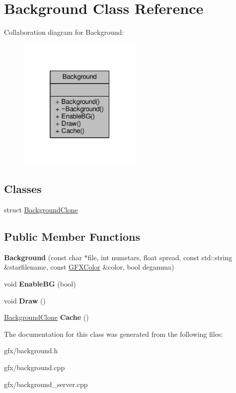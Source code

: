 \hypertarget{classBackground}{}\section{Background Class Reference}
\label{classBackground}


Collaboration diagram for Background\+:
\nopagebreak
\begin{figure}[H]
\begin{center}
\leavevmode
\includegraphics[width=169pt]{d9/d27/classBackground__coll__graph}
\end{center}
\end{figure}
\subsection*{Classes}
\begin{DoxyCompactItemize}
\item 
struct \hyperlink{structBackground_1_1BackgroundClone}{Background\+Clone}
\end{DoxyCompactItemize}
\subsection*{Public Member Functions}
\begin{DoxyCompactItemize}
\item 
{\bfseries Background} (const char $\ast$file, int numstars, float spread, const std\+::string \&starfilename, const \hyperlink{structGFXColor}{G\+F\+X\+Color} \&color, bool degamma)\hypertarget{classBackground_aed4b26fd0af7be5bed26debeeafa7895}{}\label{classBackground_aed4b26fd0af7be5bed26debeeafa7895}

\item 
void {\bfseries Enable\+BG} (bool)\hypertarget{classBackground_a53fbc7a2381a2c48d0de8b83ce54ebaf}{}\label{classBackground_a53fbc7a2381a2c48d0de8b83ce54ebaf}

\item 
void {\bfseries Draw} ()\hypertarget{classBackground_a6a491bcc0a1fc2f4eca32f415ed92c5f}{}\label{classBackground_a6a491bcc0a1fc2f4eca32f415ed92c5f}

\item 
\hyperlink{structBackground_1_1BackgroundClone}{Background\+Clone} {\bfseries Cache} ()\hypertarget{classBackground_a6ca1650f4167d0bcf4372994df19fdaa}{}\label{classBackground_a6ca1650f4167d0bcf4372994df19fdaa}

\end{DoxyCompactItemize}


The documentation for this class was generated from the following files\+:\begin{DoxyCompactItemize}
\item 
gfx/background.\+h\item 
gfx/background.\+cpp\item 
gfx/background\+\_\+server.\+cpp\end{DoxyCompactItemize}

